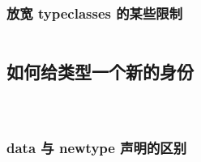 \documentclass[./main.tex]{subfiles}
\begin{document}
\begin{lstlisting}[language=Haskell]

\end{lstlisting}



\begin{lstlisting}[language=Haskell]

\end{lstlisting}



\begin{lstlisting}[language=Haskell]

\end{lstlisting}



\begin{lstlisting}[language=Haskell]

\end{lstlisting}

\subsubsection*{放宽 typeclasses 的某些限制}



\begin{lstlisting}[language=Haskell]

\end{lstlisting}

\subsection*{如何给类型一个新的身份}



\begin{lstlisting}[language=Haskell]

\end{lstlisting}



\begin{lstlisting}[language=Haskell]

\end{lstlisting}



\begin{lstlisting}[language=Haskell]

\end{lstlisting}

\subsubsection*{data 与 newtype 声明的区别}
\end{document}
